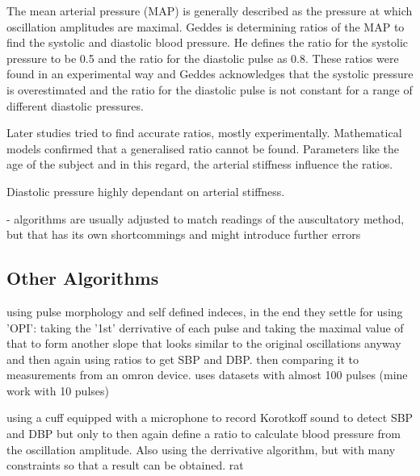 The mean arterial pressure (MAP) is generally described as the pressure at which oscillation amplitudes are maximal. Geddes is determining ratios of the MAP to find the systolic and diastolic blood pressure. He defines the ratio for the systolic pressure to be 0.5 and the ratio for the diastolic pulse as 0.8. These ratios were found in an experimental way and Geddes acknowledges that the systolic pressure is overestimated and the ratio for the diastolic pulse is not constant for a range of different diastolic pressures.

Later studies tried to find accurate ratios, mostly experimentally. Mathematical models confirmed that a generalised ratio cannot be found. Parameters like the age of the subject and in this regard, the arterial stiffness influence the ratios. \cite{Babbs2012}

Diastolic pressure highly dependant on arterial stiffness. \cite{Babbs2012}



- algorithms are usually adjusted to match readings of the auscultatory method, but that has its own shortcommings and might introduce further errors



\subsection{Other Algorithms}
using pulse morphology and self defined indeces, in the end they settle for using 'OPI': taking the '1st' derrivative of each pulse and taking the maximal value of that to form another slope that looks similar to the original oscillations anyway and then again using ratios to get SBP and DBP. then comparing it to measurements from an omron device. uses datasets with almost 100 pulses (mine work with 10 pulses) \cite{Mafi2012,Mafi2011}

using a cuff equipped with a microphone to record Korotkoff sound to detect SBP and DBP but only to then again define a ratio to calculate blood pressure from the oscillation amplitude. Also using the derrivative algorithm, but with many constraints so that a result can be obtained. rat\cite{Jazbinsek2010,Jazbinsek2005,Jazbinsek2016}
